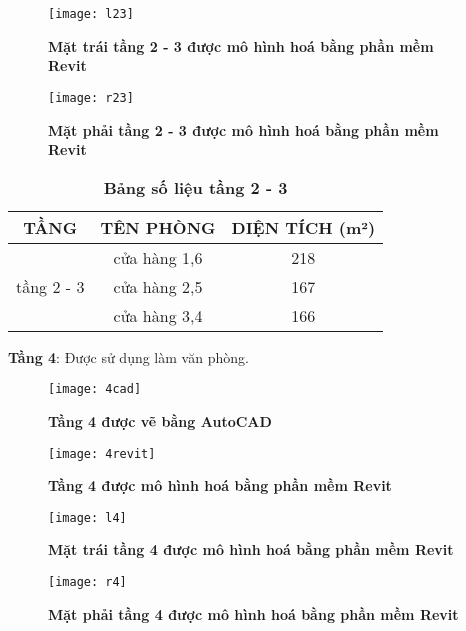 \begin{figure}[H]
	\centering
	\texttt{[image: l23]}
	\caption{\textbf{Mặt trái tầng 2 - 3 được mô hình hoá bằng phần mềm Revit}}
	\label{l23}
\end{figure} 

\begin{figure}[H]
	\centering
	\texttt{[image: r23]}
	\caption{\textbf{Mặt phải tầng 2 - 3 được mô hình hoá bằng phần mềm Revit}}
	\label{r23}
\end{figure} 

\begin{table}[H]
	\centering
	\caption{\textbf{Bảng số liệu tầng 2 - 3}}
\begin{tabular}{|c|c|c|}
	\hline
	TẦNG & TÊN PHÒNG & DIỆN TÍCH (m²)  \bigstrut\\
	\hline
	\multirow{3}[6]{*}{tầng 2 - 3} & cửa hàng 1,6 & 218 \bigstrut\\
	\cline{2-3}      & cửa hàng 2,5 & 167 \bigstrut\\
	\cline{2-3}      & cửa hàng 3,4 & 166 \bigstrut\\
	\hline
\end{tabular}%
  \label{table:bảng số liệu tầng 23}
\end{table}
\newpage

\textbf{Tầng 4}: Được sử dụng làm văn phòng.

\begin{figure}[H]
	\centering
	\texttt{[image: 4cad]}
	\caption{\textbf{Tầng 4 được vẽ bằng AutoCAD}}
	\label{4cad}
\end{figure}

\begin{figure}[H]
	\centering
	\texttt{[image: 4revit]}
	\caption{\textbf{Tầng 4 được mô hình hoá bằng phần mềm Revit}}
	\label{4revit}
\end{figure} 

\begin{figure}[H]
	\centering
	\texttt{[image: l4]}
	\caption{\textbf{Mặt trái tầng 4 được mô hình hoá bằng phần mềm Revit}}
	\label{l4}
\end{figure} 

\begin{figure}[H]
	\centering
	\texttt{[image: r4]}
	\caption{\textbf{Mặt phải tầng 4 được mô hình hoá bằng phần mềm Revit}}
	\label{r4}
\end{figure} 

